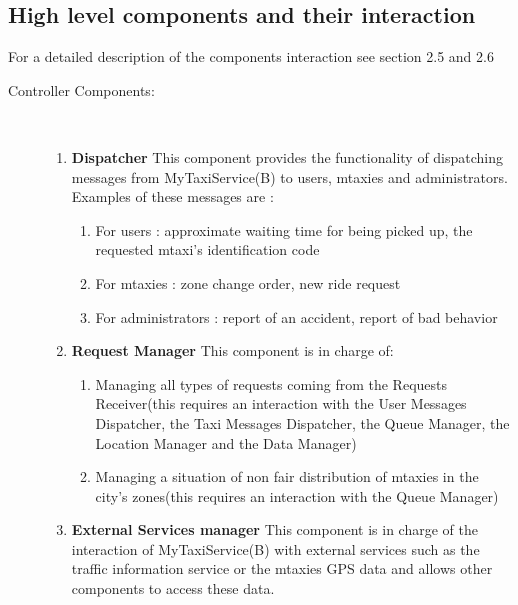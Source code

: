 \documentclass[11pt,titlepage]{article} %
\begin{document}
\subsection{High level components and their interaction}
	For a detailed description of the components interaction see section 2.5 and 2.6\newline
	\begin{description}
		\item [Controller Components:] \hfill \\
		\begin{enumerate}
		           \item \textbf{Dispatcher}
		           \newline This component provides the functionality of dispatching messages from MyTaxiService(B) to users, mtaxies and administrators.
		            Examples of these messages are :
			 \begin{enumerate}
			            \item For users : approximate waiting time for being picked up, the requested mtaxi's identification code
			            \item For mtaxies : zone change order, new ride request
			            \item For administrators : report of an accident, report of bad behavior
			\end{enumerate}
		        \item \textbf{Request Manager} 
		            \newline This component is in charge of:
			 \begin{enumerate}
			            \item Managing all types of requests coming from the Requests Receiver(this requires an
			            interaction with the User Messages Dispatcher, the Taxi Messages Dispatcher, the Queue Manager, the
			            Location Manager and the Data Manager)
			            \item Managing a situation of non fair distribution of mtaxies in the city's zones(this requires an interaction
			            with the Queue Manager)
			\end{enumerate}
		        \item \textbf{External Services manager}
		            \newline This component is in charge of the interaction of MyTaxiService(B) with external services such as
		            the traffic information service or the mtaxies GPS data and allows other components to access these data.
		

\end{enumerate}
\end{description}
\end{document}
